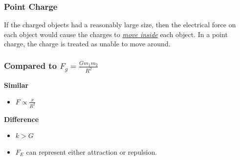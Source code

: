 \subsubsection{Point Charge}
If the charged objects had a reasonably large size, then the electrical force on each object would cause the charges to \underline{\textit{move inside}} each object. In a point charge, 
the charge is treated as unable to move around. 

\subsubsection{Compared to $F_g = \frac{Gm_1m_2}{R^2}$}
\textbf{Similar}
\begin{itemize}
    \item $F \propto \tfrac{x}{R^2}$
\end{itemize}
\textbf{Difference}
\begin{itemize}
    \item $k > G$
    \item $F_E$ can represent either attraction or repulsion.
\end{itemize}
